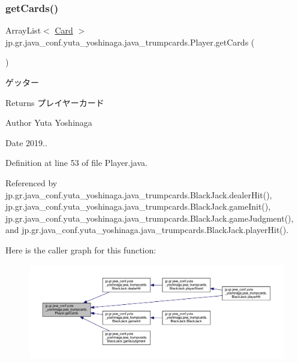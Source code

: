 \subsubsection{\texorpdfstring{get\+Cards()}{getCards()}}
{\footnotesize\ttfamily Array\+List$<$ \hyperlink{classjp_1_1gr_1_1java__conf_1_1yuta__yoshinaga_1_1java__trumpcards_1_1_card}{Card} $>$ jp.\+gr.\+java\+\_\+conf.\+yuta\+\_\+yoshinaga.\+java\+\_\+trumpcards.\+Player.\+get\+Cards (\begin{DoxyParamCaption}{ }\end{DoxyParamCaption})}



ゲッター 

\begin{DoxyReturn}{Returns}
プレイヤーカード 
\end{DoxyReturn}
\begin{DoxyAuthor}{Author}
Yuta Yoshinaga 
\end{DoxyAuthor}
\begin{DoxyDate}{Date}
2019.. 
\end{DoxyDate}


Definition at line 53 of file Player.\+java.



Referenced by jp.\+gr.\+java\+\_\+conf.\+yuta\+\_\+yoshinaga.\+java\+\_\+trumpcards.\+Black\+Jack.\+dealer\+Hit(), jp.\+gr.\+java\+\_\+conf.\+yuta\+\_\+yoshinaga.\+java\+\_\+trumpcards.\+Black\+Jack.\+game\+Init(), jp.\+gr.\+java\+\_\+conf.\+yuta\+\_\+yoshinaga.\+java\+\_\+trumpcards.\+Black\+Jack.\+game\+Judgment(), and jp.\+gr.\+java\+\_\+conf.\+yuta\+\_\+yoshinaga.\+java\+\_\+trumpcards.\+Black\+Jack.\+player\+Hit().

Here is the caller graph for this function\+:
\nopagebreak
\begin{figure}[H]
\begin{center}
\leavevmode
\includegraphics[width=350pt]{classjp_1_1gr_1_1java__conf_1_1yuta__yoshinaga_1_1java__trumpcards_1_1_player_a6fa54bc94ad8959fbf76abb1107c7385_icgraph}
\end{center}
\end{figure}
\mbox{\label{classjp_1_1gr_1_1java__conf_1_1yuta__yoshinaga_1_1java__trumpcards_1_1_player_ae905e0de5c47509076823375e6995806}} 
